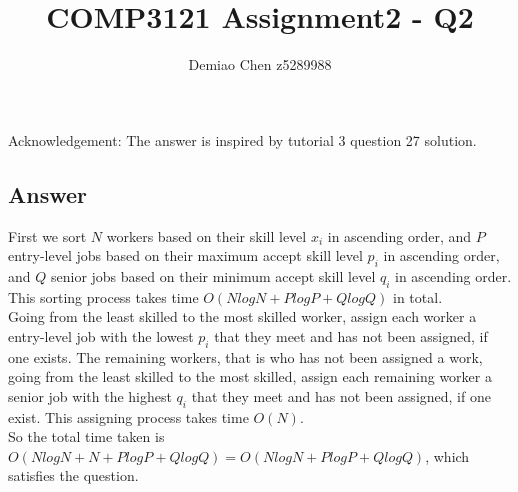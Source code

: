 \documentclass[12pt]{article}
\title{COMP3121 Assignment2 - Q2}
\author{Demiao Chen z5289988}
\begin{document}
\maketitle
{}
Acknowledgement: The answer is inspired by tutorial 3 question 27 solution.
\subsection*{Answer}
First we sort $N$ workers based on their skill level $x_i$ in ascending order, and 
$P$ entry-level jobs based on their maximum accept skill level $p_i$ in ascending order, and 
$Q$ senior jobs based on their minimum accept skill level $q_i$ in ascending order.
This sorting process takes time $O(N log N + P log P + Q log Q)$ in total. \\
Going from the least skilled to the most skilled worker, assign each worker a entry-level
job with the lowest $p_i$ that they meet and has not been assigned, if one exists. The remaining
workers, that is who has not been assigned a work, going from the least skilled to the most skilled, 
assign each remaining worker a senior job with the highest $q_i$ that they meet and has not been assigned, if one
exist. This assigning process takes time $O(N)$.\\
So the total time taken is $O(N log N + N + P log P + Q log Q) = O(N log N + P log P + Q log Q)$, which
satisfies the question.
\end{document}
